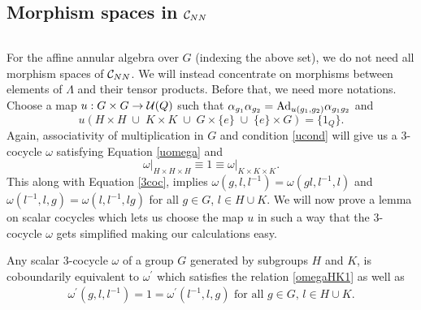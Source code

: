 \subsection{Morphism spaces in $ \mathcal C_{NN} $}$ \; $

For the affine annular algebra over $ G $ (indexing the above set), we do not need all morphism spaces of $ \mathcal C_{NN} $.
We will instead concentrate on morphisms between elements of $\Lambda  $ and their tensor products.
Before that, we need more notations.
Choose a map $ u:G\times G \rightarrow \mathcal U (Q) $ such that $ \alpha_{g_1} \alpha_{g_2} = \text{Ad}_{u(g_1, g_2)} \alpha_{g_1 g_2} $ and 
\begin{equation}\label{ucond}
u \left( H\times H \; \cup \; K\times K \; \cup \; G \times \{e\} \; \cup \; \{e\} \times G \right) = \{1_Q\}.
\end{equation}
Again, associativity of multiplication in $ G $ and condition \ref{ucond} will give us a $ 3 $-cocycle $ \omega $ satisfying Equation \ref{uomega} and 
\begin{equation}\label{omegaHK1}
\left. \omega \right|_{H\times H \times H} \equiv 1 \equiv \left. \omega \right|_{K \times K \times K}.
\end{equation}
This along with Equation \ref{3coc}, implies $\omega (g, l ,l^{-1}) = \omega (gl, l^{-1}, l)$ and $\omega (l^{-1}, l , g) = \omega (l, l^{-1}, lg)$ for all $g \in G$, $l \in H \cup K$.
We will now prove a lemma on scalar cocycles which lets us choose the map $ u $ in such a way that the $ 3 $-cocycle $ \omega $ gets simplified making our calculations easy.
\begin{lem}\label{gllemma}
Any scalar $ 3 $-cocycle $\omega$ of a group $ G $ generated by subgroups $ H $ and $ K $, is coboundarily equivalent to $\omega^{\prime}$ which satisfies the relation \ref{omegaHK1} as well as
\begin{align}\label{gl}
\omega^{\prime} (g,l,l^{-1}) = 1 = \omega^{\prime} (l^{-1}, l , g) \text{ for all $g \in G$, $l \in H \cup K$.}
\end{align}
\end{lem}
